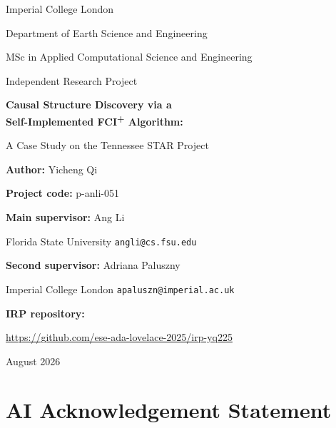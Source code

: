 \documentclass[11pt,a4paper]{article}
\theoremstyle{definition}
\newcommand{\FCIplus}{FCI\textsuperscript{+}}
\newcommand{\code}[1]{\texttt{#1}}
\begin{document}
\begin{titlepage}
\centering
\vspace*{1.6cm}
{\large Imperial College London\par}
\vspace{0.2cm}
{\large Department of Earth Science and Engineering\par}
\vspace{0.2cm}
{\large MSc in Applied Computational Science and Engineering\par}
\vspace{0.2cm}
{\large Independent Research Project\par}
\vspace{1.8cm}
{\LARGE\bfseries Causal Structure Discovery via a\\[0.35ex]
Self-Implemented \FCIplus{} Algorithm:\par}
\vspace{0.45cm}
{\Large A Case Study on the Tennessee STAR Project\par}
\vspace{1.6cm}
{\large\textbf{Author:} Yicheng Qi\par}
\vspace{0.3cm}
{\large\textbf{Project code:} p-anli-051\par}
\vspace{0.9cm}
{\large\textbf{Main supervisor:} Ang Li\par}
\vspace{0.12cm}
{\normalsize Florida State University \quad\textbar\quad \code{angli@cs.fsu.edu}\par}
\vspace{0.5cm}
{\large\textbf{Second supervisor:} Adriana Paluszny\par}
\vspace{0.12cm}
{\normalsize Imperial College London \quad\textbar\quad \code{apaluszn@imperial.ac.uk}\par}
\vspace{0.9cm}
{\normalsize\textbf{IRP repository:}\par}
\vspace{0.12cm}
{\normalsize\url{https://github.com/ese-ada-lovelace-2025/irp-yq225}\par}
\vfill
{\large August 2026\par}
\end{titlepage}


\section*{AI Acknowledgement Statement}
\end{document}

